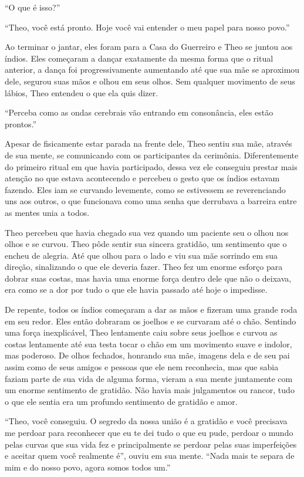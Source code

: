 ``O que é isso?''

``Theo, você está pronto. Hoje você vai entender o meu papel para nosso
povo.''

Ao terminar o jantar, eles foram para a Casa do Guerreiro e Theo se
juntou aos índios. Eles começaram a dançar exatamente da mesma forma que
o ritual anterior, a dança foi progressivamente aumentando até que sua
mãe se aproximou dele, segurou suas mãos e olhou em seus olhos. Sem
qualquer movimento de seus lábios, Theo entendeu o que ela quis dizer.

``Perceba como as ondas cerebrais vão entrando em consonância, eles estão
prontos.''

Apesar de fisicamente estar parada na frente dele, Theo sentiu sua mãe,
através de sua mente, se comunicando com os participantes da cerimônia.
Diferentemente do primeiro ritual em que havia participado, dessa vez
ele conseguiu prestar mais atenção no que estava acontecendo e percebeu
o gesto que os índios estavam fazendo. Eles iam se curvando levemente,
como se estivessem se reverenciando uns aos outros, o que funcionava
como uma senha que derrubava a barreira entre as mentes unia a todos.

Theo percebeu que havia chegado sua vez quando um paciente seu o olhou
nos olhos e se curvou. Theo pôde sentir sua sincera gratidão, um
sentimento que o encheu de alegria. Até que olhou para o lado e viu sua
mãe sorrindo em sua direção, sinalizando o que ele deveria fazer. Theo
fez um enorme esforço para dobrar suas costas, mas havia uma enorme
força dentro dele que não o deixava, era como se a dor por tudo o que
ele havia passado até hoje o impedisse.

De repente, todos os índios começaram a dar as mãos e fizeram uma grande
roda em seu redor. Eles então dobraram os joelhos e se curvaram até o
chão. Sentindo uma força inexplicável, Theo lentamente caiu sobre seus
joelhos e curvou as costas lentamente até sua testa tocar o chão em um
movimento suave e indolor, mas poderoso. De olhos fechados, honrando sua
mãe, imagens dela e de seu pai assim como de seus amigos e pessoas que
ele nem reconhecia, mas que sabia faziam parte de sua vida de alguma
forma, vieram a sua mente juntamente com um enorme sentimento de
gratidão. Não havia mais julgamentos ou rancor, tudo o que ele sentia
era um profundo sentimento de gratidão e amor.

``Theo, você conseguiu. O segredo da nossa união é a gratidão e você
precisava me perdoar para reconhecer que eu te dei tudo o que eu pude,
perdoar o mundo pelas curvas que sua vida fez e principalmente se
perdoar pelas suas imperfeições e aceitar quem você realmente é'', ouviu
em sua mente. ``Nada mais te separa de mim e do nosso povo, agora somos
todos um.''


